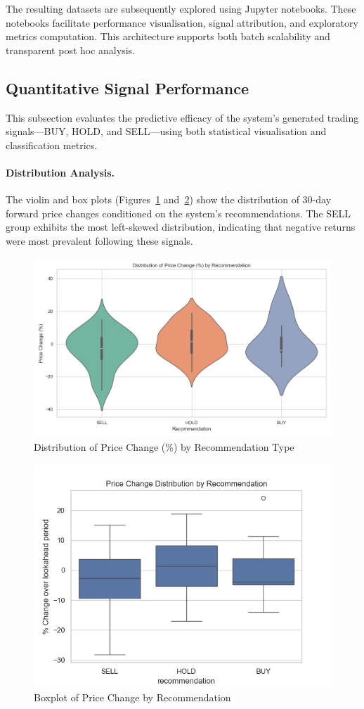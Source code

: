 The resulting datasets are subsequently explored using Jupyter notebooks. These notebooks facilitate performance visualisation, signal attribution, and exploratory metrics computation. This architecture supports both batch scalability and transparent post hoc analysis.

\subsection{Quantitative Signal Performance}

This subsection evaluates the predictive efficacy of the system's generated trading signals—BUY, HOLD, and SELL—using both statistical visualisation and classification metrics.

\paragraph{Distribution Analysis.}  
The violin and box plots (Figures~\ref{fig:violin} and~\ref{fig:box}) show the distribution of 30-day forward price changes conditioned on the system’s recommendations. The SELL group exhibits the most left-skewed distribution, indicating that negative returns were most prevalent following these signals. 

\begin{figure}[h]
  \centering
  \includegraphics[width=0.6\linewidth]{assets/violin_plot.png}
  \caption{Distribution of Price Change (\%) by Recommendation Type}
  \label{fig:violin}
\end{figure}

\begin{figure}[h]
  \centering
  \includegraphics[width=0.6\linewidth]{assets/price_change_distribution_by_recommendation.png}
  \caption{Boxplot of Price Change by Recommendation}
  \label{fig:box}
\end{figure}

